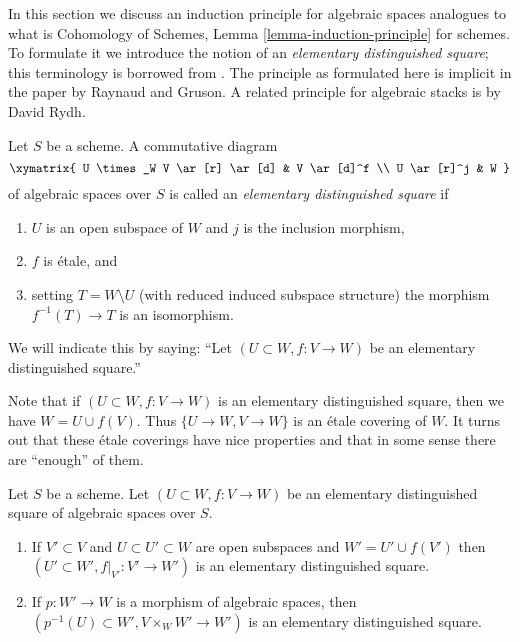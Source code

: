 \noindent
In this section we discuss an induction principle for algebraic spaces
analogues to what is
Cohomology of Schemes, Lemma \ref{lemma-induction-principle}
for schemes. To formulate it we introduce the notion of an
{\it elementary distinguished square}; this terminology is borrowed
from \cite{MV}.
The principle as formulated here is implicit in the paper \cite{GruRay}
by Raynaud and Gruson.
A related principle for algebraic stacks is
\cite[Theorem D]{rydh_etale_devissage} by David Rydh.

\begin{definition}
\label{definition-elementary-distinguished-square}
Let $S$ be a scheme. A commutative diagram
$$
\xymatrix{
U \times_W V \ar[r] \ar[d] & V \ar[d]^f \\
U \ar[r]^j & W
}
$$
of algebraic spaces over $S$ is called an {\it elementary distinguished square}
if
\begin{enumerate}
\item $U$ is an open subspace of $W$ and $j$ is the inclusion morphism,
\item $f$ is \'etale, and
\item setting $T = W \setminus U$ (with reduced induced
subspace structure) the morphism $f^{-1}(T) \to T$ is an isomorphism.
\end{enumerate}
We will indicate this by saying: ``Let $(U \subset W, f : V \to W)$
be an elementary distinguished square.''
\end{definition}

\noindent
Note that if $(U \subset W, f : V \to W)$ is an elementary distinguished
square, then we have $W = U \cup f(V)$. Thus $\{U \to W, V \to W\}$ is
an \'etale covering of $W$. It turns out that these \'etale coverings
have nice properties and that in some sense
there are ``enough'' of them.

\begin{lemma}
\label{lemma-make-more-elementary-distinguished-squares}
Let $S$ be a scheme. Let $(U \subset W, f : V \to W)$ be an elementary
distinguished square of algebraic spaces over $S$.
\begin{enumerate}
\item If $V' \subset V$ and
$U \subset U' \subset W$ are open subspaces and $W' = U' \cup f(V')$
then $(U' \subset W', f|_{V'} : V' \to W')$ is an elementary distinguished
square.
\item If $p : W' \to W$ is a morphism of algebraic spaces, then
$(p^{-1}(U) \subset W', V \times_W W' \to W')$ is an elementary distinguished
square.
\end{enumerate}
\end{lemma}

